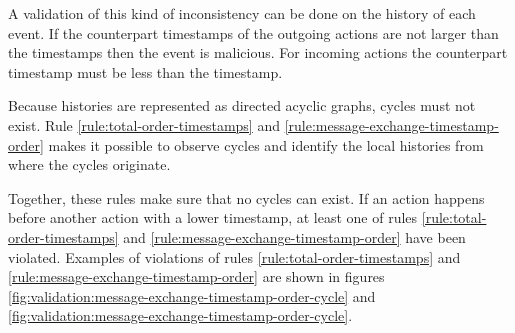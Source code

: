 	\noindent A validation of this kind of inconsistency can be done on the history of each event. If the counterpart timestamps of the outgoing actions are not larger than the timestamps then the event is malicious. For incoming actions the counterpart timestamp must be less than the timestamp.
	
	\newpar Because histories are represented as directed acyclic graphs, cycles must not exist. Rule \ref{rule:total-order-timestamps} and \ref{rule:message-exchange-timestamp-order} makes it possible to observe cycles and identify the local histories from where the cycles originate.
	
	Together, these rules make sure that no cycles can exist. If an action happens before another action with a lower timestamp, at least one of rules \ref{rule:total-order-timestamps} and \ref{rule:message-exchange-timestamp-order} have been violated. Examples of violations of rules \ref{rule:total-order-timestamps} and \ref{rule:message-exchange-timestamp-order} are shown in figures \ref{fig:validation:message-exchange-timestamp-order-cycle} and \ref{fig:validation:message-exchange-timestamp-order-cycle}.
	

